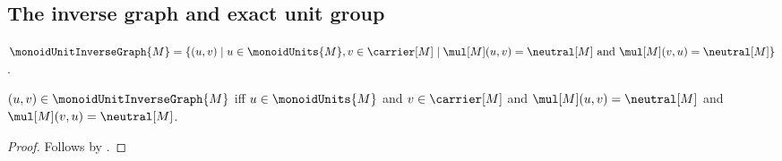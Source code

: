 \subsection{The inverse graph and exact unit group}

\begin{definition}\label{monoid_unit_inverse_graph}
    $\monoidUnitInverseGraph{M}=\{(u,v)\mid
        u\in\monoidUnits{M},v\in\carrier[M]\mid
        \text{$\mul[M](u,v)=\neutral[M]$ and
            $\mul[M](v,u)=\neutral[M]$}\}$.
\end{definition}

\begin{proposition}\label{monoid_unit_inverse_graph_iff}
    $(u,v)\in\monoidUnitInverseGraph{M}$ iff
        $u\in\monoidUnits{M}$ and $v\in\carrier[M]$ and
        $\mul[M](u,v)=\neutral[M]$ and
        $\mul[M](v,u)=\neutral[M]$.
\end{proposition}
\begin{proof}
    Follows by
        .
\end{proof}

